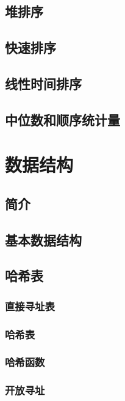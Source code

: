 \documentclass[lang=cn,newtx,10pt,scheme=chinese]{elegantbook}
\begin{document}
\chapter{堆排序}\label{chapter-06}

\chapter{快速排序}\label{chapter-07}

\chapter{线性时间排序}\label{chapter-08}

\chapter{中位数和顺序统计量}\label{chapter-09}

\part{数据结构}

\chapter*{简介}

\chapter{基本数据结构}\label{chapter-10}

\chapter{哈希表}\label{chapter-11}

\section{直接寻址表}\label{section-11.1}

\section{哈希表}\label{section-11.2}

\section{哈希函数}\label{section-11.3}

\section{开放寻址}\label{section-11.4}
\end{document}
